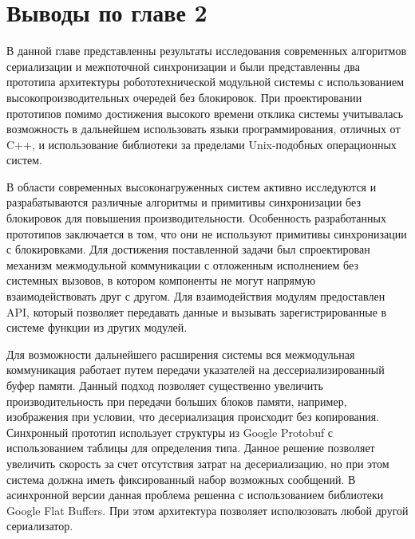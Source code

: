 \section*{Выводы по главе 2}

В данной главе представленны результаты исследования современных алгоритмов сериализации и межпоточной синхронизации и были представленны два прототипа архитектуры робототехнической модульной системы с использованием высокопроизводительных очередей без блокировок. При проектировании прототипов помимо достижения высокого времени отклика системы учитывалась возможность в дальнейшем использовать языки программирования, отличных от C++, и использование библиотеки за пределами Unix-подобных операционных систем.

В области современных высоконагруженных систем активно исследуются и разрабатываются различные алгоритмы и примитивы синхронизации без блокировок для повышения производительности.  Особенность разработанных прототипов заключается в том, что они не используют примитивы синхронизации с блокировками. Для достижения поставленной задачи был спроектирован механизм межмодульной коммуникации с отложенным исполнением без системных вызовов, в котором компоненты не могут напрямую взаимодействовать друг с другом. Для взаимодействия модулям предоставлен API, который позволяет передавать данные и вызывать зарегистрированные в системе функции из других модулей.

Для возможности дальнейшего расширения системы вся межмодульная коммуникация работает путем передачи указателей на дессериализированный буфер памяти. Данный подход позволяет существенно увеличить производительность при передачи больших блоков памяти, например, изображения при условии, что десериализация происходит без копирования. Синхронный прототип использует структуры из Google Protobuf с использованием таблицы для определения типа. Данное решение позволяет увеличить скорость за счет отсутствия затрат на десериализацию, но при этом система должна иметь фиксированный набор возможных сообщений. В асинхронной версии данная проблема решенна с использованием библиотеки Google Flat Buffers. При этом архитектура позволяет исполюзовать любой другой сериализатор.